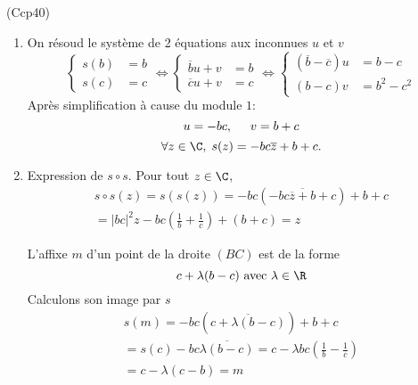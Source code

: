 \begin{tiny}(Ccp40)\end{tiny}
\begin{enumerate}
 \item On résoud le système de 2 équations aux inconnues $u$ et $v$
\begin{displaymath}
\left\lbrace 
\begin{aligned}
 s(b) &= b \\ s(c) &= c
\end{aligned}
\right. 
\Leftrightarrow
\left\lbrace 
\begin{aligned}
 \overline{b}u + v &= b \\ \overline{c}u + v &= c
\end{aligned}
\right. 
\Leftrightarrow
\left\lbrace 
\begin{aligned}
 (\overline{b}-\overline{c})u &= b-c \\ (b-c)v &=b^2- c^2
\end{aligned}
\right. 
\end{displaymath}
Après simplification à cause du module $1$:
\begin{displaymath}
 u = -bc,\hspace{0.5cm} v =b+c
\end{displaymath}
\begin{displaymath}
 \forall z\in \C,\;s(z) = -bc\overline{z} + b+c.
\end{displaymath}

 \item Expression de $s\circ s$. Pour tout $z\in \C$,
\begin{multline*}
s\circ s(z) = s(s(z)) 
= -bc(\overline{-bc\overline{z}+b+c}) +b+c \\
= |bc|^2z -bc(\frac{1}{b}+\frac{1}{c}) + (b+c) = z
\end{multline*}

L'affixe $m$ d'un point de la droite $(BC)$ est de la forme
\begin{displaymath}
 c + \lambda(b-c) \text{ avec } \lambda\in \R
\end{displaymath}
Calculons son image par $s$
\begin{multline*}
 s(m) = -bc (\overline{c + \lambda(b-c)}) + b+c \\
 = s(c) -bc\overline{\lambda(b-c)}
 = c -\lambda bc(\frac{1}{b}-\frac{1}{c})\\
 = c -\lambda(c-b) = m
\end{multline*}

\end{enumerate}
